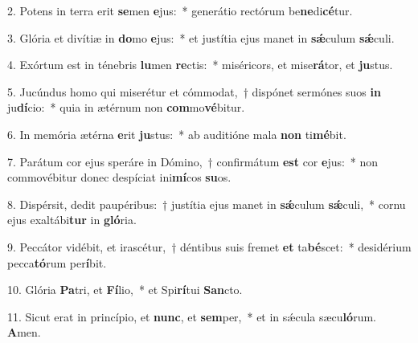 \item 2. Potens in terra erit \textbf{se}men \textbf{e}jus:~* generátio rectórum be\textbf{ne}di\textbf{cé}tur.
\item 3. Glória et divítiæ in \textbf{do}mo \textbf{e}jus:~* et justítia ejus manet in \textbf{sǽ}culum \textbf{sǽ}culi.
\item 4. Exórtum est in ténebris \textbf{lu}men \textbf{re}ctis:~* miséricors, et mise\textbf{rá}tor, et \textbf{ju}stus.
\item 5. Jucúndus homo qui miserétur et cómmodat,~† dispónet sermónes suos \textbf{in} ju\textbf{dí}cio:~* quia in ætérnum non \textbf{com}mo\textbf{vé}bitur.
\item 6. In memória ætérna \textbf{e}rit \textbf{ju}stus:~* ab auditióne mala \textbf{non} ti\textbf{mé}bit.
\item 7. Parátum cor ejus speráre in Dómino,~† confirmátum \textbf{est} cor \textbf{e}jus:~* non commovébitur donec despíciat ini\textbf{mí}cos \textbf{su}os.
\item 8. Dispérsit, dedit paupéribus:~† justítia ejus manet in \textbf{sǽ}culum \textbf{sǽ}culi,~* cornu ejus exaltábi\textbf{tur} in \textbf{gló}ria.
\item 9. Peccátor vidébit, et irascétur,~† déntibus suis fremet \textbf{et} ta\textbf{bé}scet:~* desidérium pecca\textbf{tó}rum per\textbf{í}bit.
\item 10. Glória \textbf{Pa}tri, et \textbf{Fí}lio,~* et Spi\textbf{rí}tui \textbf{San}cto.
\item 11. Sicut erat in princípio, et \textbf{nunc}, et \textbf{sem}per,~* et in sǽcula sæcu\textbf{ló}rum. \textbf{A}men.
